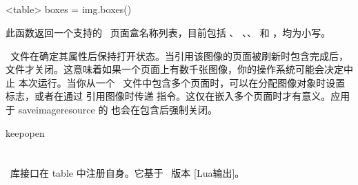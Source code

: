 \subsection{}


\begin{typing}
<table> boxes = img.boxes()
\end{typing}

此函数返回一个支持的 \PDF\ 页面盒名称列表，目前包括 、
、、 和 ，均为小写。

\PDF\ 文件在确定其属性后保持打开状态。当引用该图像的页面被刷新时包含完成后，
文件才关闭。这意味着如果一个页面上有数千张图像，你的操作系统可能会决定中止
本次运行。当你从一个 \PDF\ 文件中包含多个页面时，可以在分配图像对象时设置
 标志，或者在通过  引用图像时传递
 指令。这仅在嵌入多个页面时才有意义。应用于 \lpr
{saveimageresource} 的  也会在包含后强制关闭。

\begin{typing}
\immediate{}%
          \saveimageresource         \lastsavedimageresourceindex %
          \saveimageresource         \lastsavedimageresourceindex %
          \saveimageresource keepopen\lastsavedimageresourceindex %

\end{typing}

\section{}

\topicindex {\METAPOST}


\MP\ 库接口在 table  中注册自身。它基于 \MPLIB\ 版本
[Lua输出]。

\subsection{}


